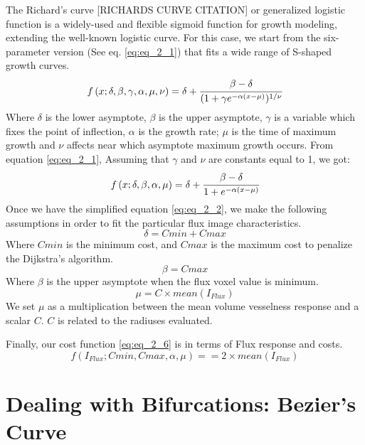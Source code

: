 The Richard's curve [RICHARDS CURVE CITATION] or generalized logistic function is a widely-used and flexible sigmoid function for growth modeling, extending the well-known logistic curve. For this case, we start from the six-parameter version (See eq. \ref{eq:eq_2_1}) that fits a wide range of S-shaped growth curves. 
\begin{equation}
\label{eq:eq_2_1}
f\left( x;\delta,\beta,\gamma,\alpha,\mu,\nu\right) = \delta + \cfrac{\beta-\delta}{(1+\gamma e^{-\alpha(x-\mu)})^{1/\nu}}
\end{equation}
Where $\delta$ is the lower asymptote, $\beta$ is the upper asymptote, $\gamma$ is a variable which fixes the point of inflection, $\alpha$ is the growth rate; $\mu$ is the time of maximum growth and $\nu$ affects near which asymptote maximum growth occurs.
From equation \ref{eq:eq_2_1}, Assuming that $\gamma$ and $\nu$ are constants equal to 1, we got:
\begin{equation}
\label{eq:eq_2_2}
f\left( x;\delta,\beta,\alpha,\mu\right) = \delta + \cfrac{\beta-\delta}{1+e^{-\alpha(x-\mu)}}
\end{equation}
Once we have the simplified equation \ref{eq:eq_2_2}, we make the following assumptions in order to fit the particular flux image characteristics.
\begin{equation}
\label{eq:eq_2_3}
\delta = Cmin + Cmax
\end{equation}
Where $Cmin$ is the minimum cost, and $Cmax$ is the maximum cost to penalize the Dijkstra's algorithm. 
\begin{equation}
\label{eq:eq_2_4}
\beta = Cmax
\end{equation}
Where $\beta$ is the upper asymptote when the flux voxel value is minimum.
\begin{equation}
\label{eq:eq_2_5}
\mu = C \times mean(I_{Flux}) 
\end{equation}
We set $\mu$ as a multiplication between the mean volume vesselness response and a scalar $C$. $C$ is related to the radiuses evaluated.

Finally, our cost function \ref{eq:eq_2_6} is in terms of Flux response and costs.
\begin{equation}
\label{eq:eq_2_6}
f( I_{Flux};Cmin, Cmax, \alpha,\mu) == 2\times mean(I_{Flux}) 
\end{equation}

\section{Dealing with Bifurcations: Bezier's Curve}

